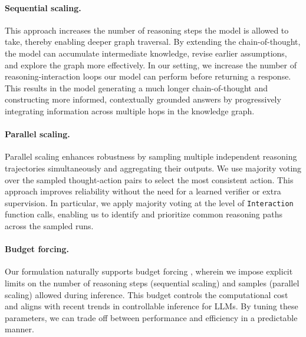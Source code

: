 \paragraph{Sequential scaling.} This approach increases the number of reasoning steps the model is allowed to take, thereby enabling deeper graph traversal. By extending the chain-of-thought, the model can accumulate intermediate knowledge, revise earlier assumptions, and explore the graph more effectively. In our setting, we increase the number of reasoning-interaction loops our model can perform before returning a response. This results in the model generating a much longer chain-of-thought and constructing more informed, contextually grounded answers by progressively integrating information across multiple hops in the knowledge graph.

\paragraph{Parallel scaling.} Parallel scaling enhances robustness by sampling multiple independent reasoning trajectories simultaneously and aggregating their outputs. We use majority voting over the sampled thought-action pairs \citep{brown2024largelanguagemonkeysscaling} to select the most consistent action. This approach improves reliability without the need for a learned verifier or extra supervision. In particular, we apply majority voting at the level of \texttt{Interaction} function calls, enabling us to identify and prioritize common reasoning paths across the sampled runs.


\paragraph{Budget forcing.} Our formulation naturally supports budget forcing \citep{muennighoff2025s1simpletesttimescaling}, wherein we impose explicit limits on the number of reasoning steps (sequential scaling) and samples (parallel scaling) allowed during inference. This budget controls the computational cost and aligns with recent trends in controllable inference for LLMs. By tuning these parameters, we can trade off between performance and efficiency in a predictable manner.
